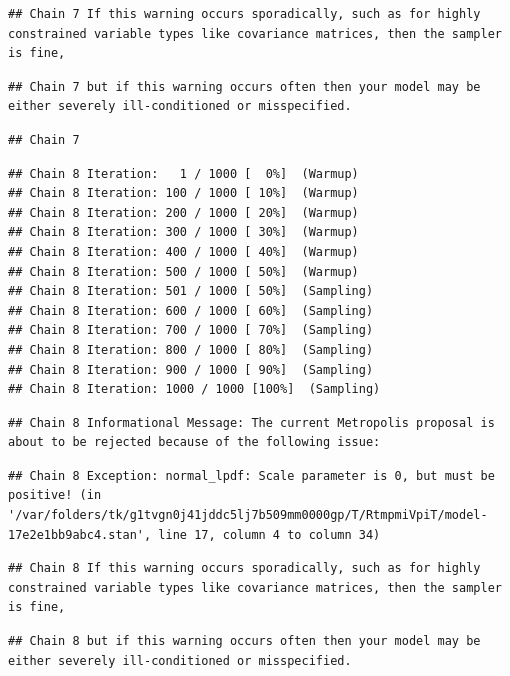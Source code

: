 \documentclass[
]{book}
\begin{document}
\begin{verbatim}
## Chain 7 If this warning occurs sporadically, such as for highly constrained variable types like covariance matrices, then the sampler is fine,
\end{verbatim}

\begin{verbatim}
## Chain 7 but if this warning occurs often then your model may be either severely ill-conditioned or misspecified.
\end{verbatim}

\begin{verbatim}
## Chain 7
\end{verbatim}

\begin{verbatim}
## Chain 8 Iteration:   1 / 1000 [  0%]  (Warmup) 
## Chain 8 Iteration: 100 / 1000 [ 10%]  (Warmup) 
## Chain 8 Iteration: 200 / 1000 [ 20%]  (Warmup) 
## Chain 8 Iteration: 300 / 1000 [ 30%]  (Warmup) 
## Chain 8 Iteration: 400 / 1000 [ 40%]  (Warmup) 
## Chain 8 Iteration: 500 / 1000 [ 50%]  (Warmup) 
## Chain 8 Iteration: 501 / 1000 [ 50%]  (Sampling) 
## Chain 8 Iteration: 600 / 1000 [ 60%]  (Sampling) 
## Chain 8 Iteration: 700 / 1000 [ 70%]  (Sampling) 
## Chain 8 Iteration: 800 / 1000 [ 80%]  (Sampling) 
## Chain 8 Iteration: 900 / 1000 [ 90%]  (Sampling) 
## Chain 8 Iteration: 1000 / 1000 [100%]  (Sampling)
\end{verbatim}

\begin{verbatim}
## Chain 8 Informational Message: The current Metropolis proposal is about to be rejected because of the following issue:
\end{verbatim}

\begin{verbatim}
## Chain 8 Exception: normal_lpdf: Scale parameter is 0, but must be positive! (in '/var/folders/tk/g1tvgn0j41jddc5lj7b509mm0000gp/T/RtmpmiVpiT/model-17e2e1bb9abc4.stan', line 17, column 4 to column 34)
\end{verbatim}

\begin{verbatim}
## Chain 8 If this warning occurs sporadically, such as for highly constrained variable types like covariance matrices, then the sampler is fine,
\end{verbatim}

\begin{verbatim}
## Chain 8 but if this warning occurs often then your model may be either severely ill-conditioned or misspecified.
\end{verbatim}
\end{document}
